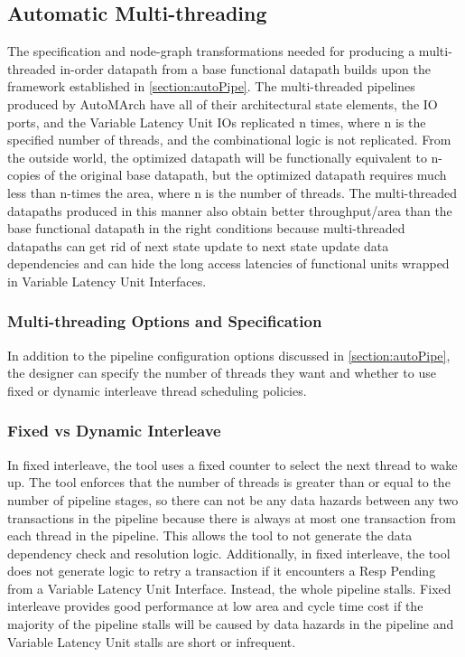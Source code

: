 \subsection{Automatic Multi-threading}
\label{section:autoMult}
The specification and node-graph transformations needed for producing a multi-threaded in-order datapath from a base functional datapath builds upon the framework established in \ref{section:autoPipe}. The multi-threaded pipelines produced by AutoMArch have all of their architectural state elements, the IO ports, and the Variable Latency Unit IOs replicated n times, where n is the specified number of threads, and the combinational logic is not replicated. From the outside world, the optimized datapath will be functionally equivalent to n-copies of the original base datapath, but the optimized datapath requires much less than n-times the area, where n is the number of threads. The multi-threaded datapaths produced in this manner also obtain better throughput/area than the base functional datapath in the right conditions because multi-threaded datapaths can get rid of next state update to next state update data dependencies and can hide the long access latencies of functional units wrapped in Variable Latency Unit Interfaces.

\subsubsection{Multi-threading Options and Specification}
In addition to the pipeline configuration options discussed in \ref{section:autoPipe}, the designer can specify the number of threads they want and whether to use fixed or dynamic interleave thread scheduling policies. 

\subsubsection{Fixed vs Dynamic Interleave}
In fixed interleave, the tool uses a fixed counter to select the next thread to wake up. The tool enforces that the number of threads is greater than or equal to the number of pipeline stages, so there can not be any data hazards between any two transactions in the pipeline because there is always at most one transaction from each thread in the pipeline. This allows the tool to not generate the data dependency check and resolution logic. Additionally, in fixed interleave, the tool does not generate logic to retry a transaction if it encounters a Resp Pending from a Variable Latency Unit Interface. Instead, the whole pipeline stalls. Fixed interleave provides good performance at low area and cycle time cost if the majority of the pipeline stalls will be caused by data hazards in the pipeline and Variable Latency Unit stalls are short or infrequent.

